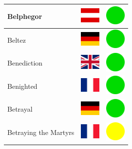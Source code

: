\documentclass[12pt, a4paper, twoside]{report}
\begin{document}
\begin{center}
\begin{longtable}{|p{5cm}|p{2cm}|p{2cm}|}
Belphegor & \includegraphics[width=1cm]{4x3/at} & \includegraphics[width=1cm]{likes/y} \\ \hline
Beltez & \includegraphics[width=1cm]{4x3/de} & \includegraphics[width=1cm]{likes/y} \\ \hline
Benediction & \includegraphics[width=1cm]{4x3/gb} & \includegraphics[width=1cm]{likes/y} \\ \hline
Benighted & \includegraphics[width=1cm]{4x3/fr} & \includegraphics[width=1cm]{likes/y} \\ \hline
Betrayal & \includegraphics[width=1cm]{4x3/de} & \includegraphics[width=1cm]{likes/y} \\ \hline
Betraying the Martyrs & \includegraphics[width=1cm]{4x3/fr} & \includegraphics[width=1cm]{likes/m} \\ \hline

\end{longtable}
\end{center}
\end{document}
